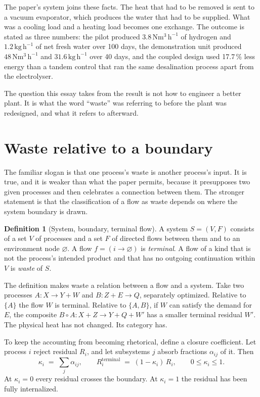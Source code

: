 \documentclass[11pt]{article}
\theoremstyle{definition}
\newtheorem{definition}{Definition}
\theoremstyle{remark}
\begin{document}
The paper's system joins these facts. The heat that had to be removed is sent to a vacuum evaporator, which produces the water that had to be supplied. What was a cooling load and a heating load becomes one exchange. The outcome is stated as three numbers: the pilot produced $3.8\,\mathrm{Nm^{3}\,h^{-1}}$ of hydrogen and $1.2\,\mathrm{kg\,h^{-1}}$ of net fresh water over 100 days, the demonstration unit produced $48\,\mathrm{Nm^{3}\,h^{-1}}$ and $31.6\,\mathrm{kg\,h^{-1}}$ over 40 days, and the coupled design used 17.7\,\% less energy than a tandem control that ran the same desalination process apart from the electrolyser.

The question this essay takes from the result is not how to engineer a better plant. It is what the word ``waste'' was referring to before the plant was redesigned, and what it refers to afterward.

\section{Waste relative to a boundary}

The familiar slogan is that one process's waste is another process's input. It is true, and it is weaker than what the paper permits, because it presupposes two given processes and then celebrates a connection between them. The stronger statement is that the classification of a flow as waste depends on where the system boundary is drawn.

\begin{definition}[System, boundary, terminal flow]
A system $S=(V,F)$ consists of a set $V$ of processes and a set $F$ of directed flows between them and to an environment node $\varnothing$. A flow $f=(i\to\varnothing)$ is \emph{terminal}. A flow of a kind that is not the process's intended product and that has no outgoing continuation within $V$ is \emph{waste} of $S$.
\end{definition}

The definition makes waste a relation between a flow and a system. Take two processes $A:X\to Y+W$ and $B:Z+E\to Q$, separately optimized. Relative to $\{A\}$ the flow $W$ is terminal. Relative to $\{A,B\}$, if $W$ can satisfy the demand for $E$, the composite $B\circ A:X+Z\to Y+Q+W'$ has a smaller terminal residual $W'$. The physical heat has not changed. Its category has.

To keep the accounting from becoming rhetorical, define a closure coefficient. Let process $i$ reject residual $R_i$, and let subsystems $j$ absorb fractions $\alpha_{ij}$ of it. Then
\begin{equation}
  \kappa_i \;=\; \sum_j \alpha_{ij}, \qquad R_i^{\mathrm{terminal}} \;=\; (1-\kappa_i)\,R_i, \qquad 0\le\kappa_i\le 1.
  \label{eq:kappa}
\end{equation}
At $\kappa_i=0$ every residual crosses the boundary. At $\kappa_i=1$ the residual has been fully internalized.
\end{document}
